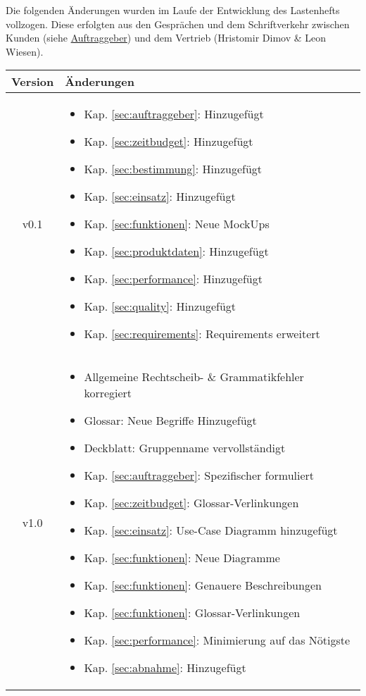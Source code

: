 Die folgenden Änderungen wurden im Laufe der Entwicklung des Lastenhefts vollzogen. Diese erfolgten aus den Gesprächen und dem Schriftverkehr zwischen Kunden (siehe \hyperref[sec:auftraggeber]{Auftraggeber}) und dem Vertrieb (Hristomir Dimov \& Leon Wiesen).

\begin{xltabular}{\textwidth}{|c|X|}
    \hline
    \textbf{Version}   & \textbf{Änderungen}     \\
    \hline

    v0.1    &  \begin{itemize}
        \item Kap. \ref{sec:auftraggeber}: Hinzugefügt
        \item Kap. \ref{sec:zeitbudget}: Hinzugefügt
        \item Kap. \ref{sec:bestimmung}: Hinzugefügt
        \item Kap. \ref{sec:einsatz}: Hinzugefügt
        \item Kap. \ref{sec:funktionen}: Neue MockUps
        \item Kap. \ref{sec:produktdaten}: Hinzugefügt
        \item Kap. \ref{sec:performance}: Hinzugefügt
        \item Kap. \ref{sec:quality}: Hinzugefügt
        \item Kap. \ref{sec:requirements}: Requirements erweitert
    \end{itemize}
    \\ \hline

    v1.0   & \begin{itemize}
        \item Allgemeine Rechtscheib- \& Grammatikfehler korregiert
        \item Glossar: Neue Begriffe Hinzugefügt
        \item Deckblatt: Gruppenname vervollständigt
        \item Kap. \ref{sec:auftraggeber}: Spezifischer formuliert
        \item Kap. \ref{sec:zeitbudget}: Glossar-Verlinkungen
        \item Kap. \ref{sec:einsatz}: Use-Case Diagramm hinzugefügt
        \item Kap. \ref{sec:funktionen}: Neue Diagramme
        \item Kap. \ref{sec:funktionen}: Genauere Beschreibungen
        \item Kap. \ref{sec:funktionen}: Glossar-Verlinkungen
        \item Kap. \ref{sec:performance}: Minimierung auf das Nötigste
        \item Kap. \ref{sec:abnahme}: Hinzugefügt
    \end{itemize}
    \\ \hline

\end{xltabular}